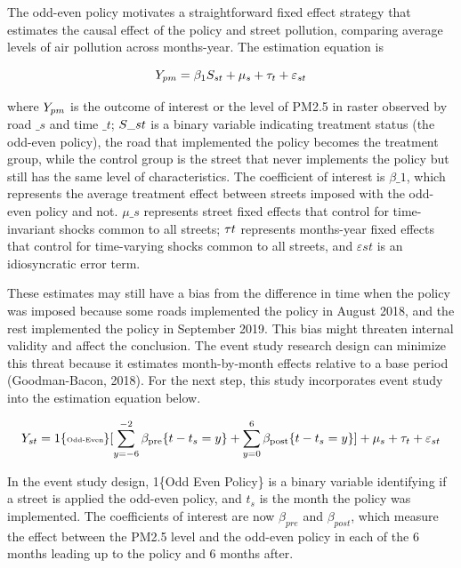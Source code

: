 \documentclass[AEJ]{AEA}
\begin{document}
The odd-even policy motivates a straightforward fixed effect strategy
that estimates the causal effect of the policy and street pollution, comparing average levels of air pollution across months-year. The estimation equation is

\[
\small Y_{pm} = \beta_{1} S_{st}  + \mu_{s} + \tau_t + \varepsilon_{st}
\]

where \(\small Y_{pm}\) is the outcome of interest or the level of PM2.5 in raster observed by road \(\_{s}\) and time \(\_t\);
\(\small S\_{st}\) is a binary variable indicating treatment status (the odd-even policy), the road that implemented the policy becomes the
treatment group, while the control group is the street that never implements the policy but still has the same level of characteristics. The
coefficient of interest is \(\beta\_{1}\), which represents the average treatment effect between streets imposed with the odd-even policy and
not. \(\mu\_s\) represents street fixed effects that control for time-invariant shocks common to all streets; \(\tau\*t\*\) represents months-year fixed effects that control for time-varying shocks common to all streets, and \(\varepsilon{st}\) is an idiosyncratic error term.

These estimates may still have a bias from the difference in time when the policy was imposed because some roads implemented the policy in
August 2018, and the rest implemented the policy in September 2019. This bias might threaten internal validity and affect the conclusion. The event study research design can minimize this threat because it
estimates month-by-month effects relative to a base period (Goodman-Bacon, 2018). For the next step, this study incorporates event study into the estimation equation below.

\[
\tiny Y_{st} = 1\{\text{Odd-Even}\}[\sum_{y=-6}^{-2}\beta_{\text{pre}}\{t - t_s = y\} + \sum_{y=0}^{6}\beta_{\text{post}}\{t - t_s = y\}] + \mu_s + \tau_t + \varepsilon_{st}
\]

In the event study design, 1\{Odd Even Policy\} is a binary variable
identifying if a street is applied the odd-even policy, and \(t_s\) is
the month the policy was implemented. The coefficients of interest are
now \(\beta_{pre}\) and \(\beta_{post}\), which measure the effect
between the PM2.5 level and the odd-even policy in each of the 6 months
leading up to the policy and 6 months after.
\end{document}

